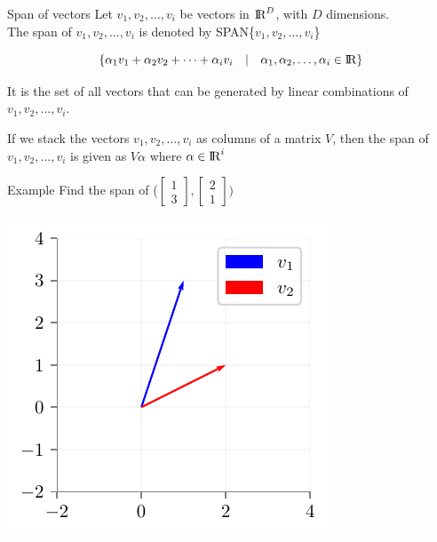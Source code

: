 \documentclass{beamer}
\begin{document}
\begin{frame}{Span of vectors}
    Let $v_{1},v_{2},\dots,v_{i}$ be vectors in  ${\rm I\!R}^{D}$, with $D$ dimensions. \\
    \pause The span of  $v_{1},v_{2},\dots,v_{i}$ is denoted by SPAN\{$v_{1},v_{2},\dots,v_{i} $\}
    
    \pause \begin{equation*}
    \{	\alpha_{1}v_{1}+			\alpha_{2}v_{2}+
    \dots+\alpha_{i}v_{i} \hspace{1em}\vert \hspace{1em}  \alpha_{1},\alpha_{2},\dots,\alpha_{i} \in {\rm I\!R}\}
    \end{equation*}
    
    \pause  It is the set of all vectors that can be generated by linear combinations of $v_{1},v_{2},\dots,v_{i}$.

    \pause If we stack the vectors $v_{1},v_{2},\dots,v_{i}$ as columns of a matrix $V$, then the span of $v_{1},v_{2},\dots,v_{i}$ is given as $V\alpha$ where $\alpha \in {\rm I\!R}^{i}$
\end{frame}

\begin{frame}{Example}
Find the span of ($\begin{bmatrix}
1 \\3
\end{bmatrix}, \begin{bmatrix}
2 \\1
\end{bmatrix}) $

\includegraphics{../assets/linear-regression/figures/geoemetric-span-1.pdf}



\end{frame}
\end{document}
